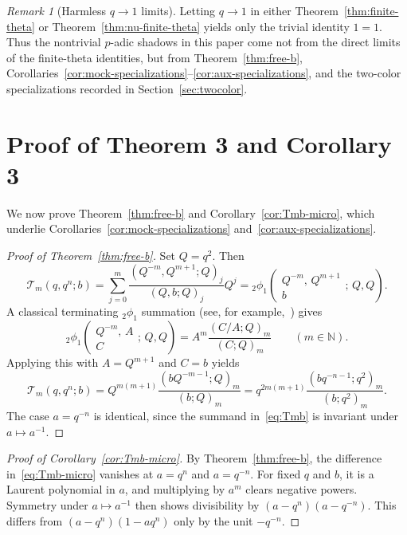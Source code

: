 \documentclass[reqno]{amsart}
\theoremstyle{definition}
\theoremstyle{plain}
\theoremstyle{remark}
\newtheorem{remark}{Remark}
\newcommand{\T}{\mathcal{T}}
\numberwithin{equation}{section}
\begin{document}
\begin{remark}[Harmless $q\to 1$ limits]\label{rem:harmless-limits}
Letting $q\to 1$ in either Theorem~\ref{thm:finite-theta} or Theorem~\ref{thm:nu-finite-theta} yields only the trivial identity $1=1$. Thus the nontrivial $p$-adic shadows in this paper come not from the direct limits of the finite-theta identities, but from Theorem~\ref{thm:free-b}, Corollaries~\ref{cor:mock-specializations}--\ref{cor:aux-specializations}, and the two-color specializations recorded in Section~\ref{sec:twocolor}.
\end{remark}

\section{Proof of Theorem 3 and Corollary 3}\label{sec:proof-Tfamily}

We now prove Theorem~\ref{thm:free-b} and Corollary~\ref{cor:Tmb-micro}, which underlie Corollaries~\ref{cor:mock-specializations} and~\ref{cor:aux-specializations}.

\begin{proof}[Proof of Theorem~\ref{thm:free-b}]
Set $Q=q^2$. Then
\[
\T_m(q,q^n;b)
=\sum_{j=0}^{m}\frac{(Q^{-m},Q^{m+1};Q)_j}{(Q,b;Q)_j}Q^j
={}_2\phi_1\!\left(\begin{matrix}Q^{-m},\,Q^{m+1}\\b\end{matrix};\,Q,Q\right).
\]
A classical terminating ${}_2\phi_1$ summation (see, for example,~\cite[eq.~(1.5.1)]{gasper-rahman}) gives
\[
{}_2\phi_1\!\left(\begin{matrix}Q^{-m},\,A\\C\end{matrix};\,Q,Q\right)
=A^m\frac{(C/A;Q)_m}{(C;Q)_m}
\qquad (m\in\mathbb{N}).
\]
Applying this with $A=Q^{m+1}$ and $C=b$ yields
\[
\T_m(q,q^n;b)
=Q^{m(m+1)}\frac{(bQ^{-m-1};Q)_m}{(b;Q)_m}
=q^{2m(m+1)}\frac{(bq^{-n-1};q^2)_m}{(b;q^2)_m}.
\]
The case $a=q^{-n}$ is identical, since the summand in~\eqref{eq:Tmb} is invariant under $a\mapsto a^{-1}$.
\end{proof}

\begin{proof}[Proof of Corollary~\ref{cor:Tmb-micro}]
By Theorem~\ref{thm:free-b}, the difference in~\eqref{eq:Tmb-micro} vanishes at $a=q^n$ and $a=q^{-n}$. For fixed $q$ and $b$, it is a Laurent polynomial in $a$, and multiplying by $a^m$ clears negative powers. Symmetry under $a\mapsto a^{-1}$ then shows divisibility by $(a-q^n)(a-q^{-n})$. This differs from $(a-q^n)(1-aq^n)$ only by the unit $-q^{-n}$.
\end{proof}
\end{document}

